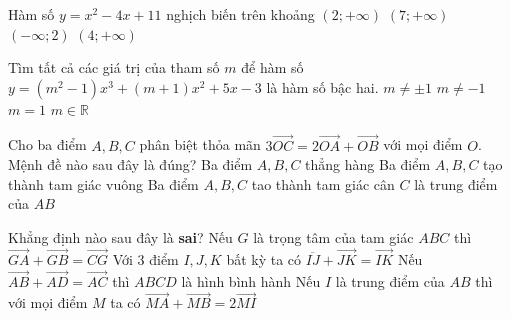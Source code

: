 \begin{ex}%
	Hàm số $y=x^2-4 x+11$ nghịch biến trên khoảng
	\choice
	{$(2 ;+\infty)$}
	{$(7 ;+\infty)$}
	{\True $(-\infty ; 2)$}
	{$(4 ;+\infty)$}
\end{ex}
\begin{ex}%
	Tìm tất cả các giá trị của tham số $m$ để hàm số $y=\left(m^2-1\right) x^3+(m+1) x^2+5 x-3$ là hàm số bậc hai.
	\choice
	{$m \neq \pm 1$}
	{$m \neq-1$}
	{\True $m=1$}
	{$m \in \mathbb{R}$}
\end{ex}
\begin{ex}%
	Cho ba điểm $A, B, C$ phân biệt thỏa mãn $3 \overrightarrow{O C}=2 \overrightarrow{O A}+\overrightarrow{O B}$ với mọi điểm $O$. Mệnh đề nào sau đây là đúng?
	\choice
	{\True Ba điểm $A, B, C$ thẳng hàng}
	{Ba điểm $A, B, C$ tạo thành tam giác vuông}
	{Ba điểm $A, B, C$ tao thành tam giác cân}
	{$C$ là trung điểm của $A B$}
\end{ex}
\begin{ex}%
	Khẳng định nào sau đây là \textbf{sai}?
	\choice
	{Nếu $G$ là trọng tâm của tam giác $A B C$ thì $\overrightarrow{G A}+\overrightarrow{G B}=\overrightarrow{C G}$}
	{Với 3 điểm $I, J, K$ bất kỳ ta có $\overline{I J}+\overrightarrow{J K}=\overrightarrow{I K}$}
	{\True Nếu $\overrightarrow{A B}+\overrightarrow{A D}=\overrightarrow{A C}$ thì $A B C D$ là hình bình hành}
	{Nếu $I$ là trung điểm của $A B$ thì với mọi điểm $M$ ta có $\overrightarrow{M A}+\overrightarrow{M B}=2 \overrightarrow{M I}$}
\end{ex}
